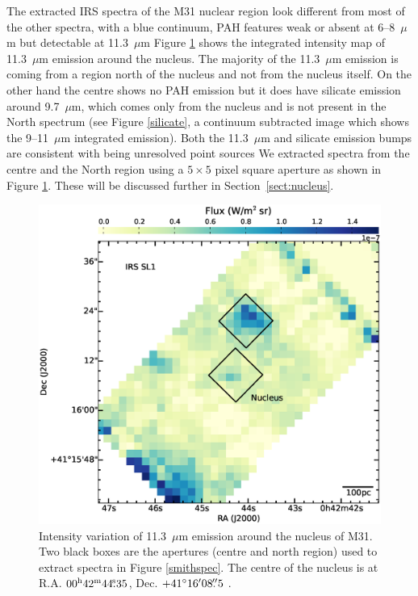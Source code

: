 The extracted IRS spectra of the M31 nuclear region look different from most of the other spectra, with
a blue continuum, PAH features weak or absent at 6--8~$\mu$m  but detectable at 11.3~$\mu$m
Figure \ref{nuc11} shows the integrated intensity map of 11.3~$\mu$m emission around the nucleus. The majority of the 11.3~$\mu$m 
emission is coming from a region north of the nucleus and not from the nucleus itself. 
On the other hand the centre shows no PAH emission  but it does have silicate emission around 9.7~$\mu$m, 
which comes only from the nucleus and is not present in the North spectrum 
(see Figure \ref{silicate}, a continuum subtracted image which shows the 9--11~$\mu$m integrated emission).
Both the 11.3~$\mu$m  and silicate emission bumps are consistent with being unresolved point sources %
We extracted spectra from the centre and the North region using a $5 \times 5$ pixel %
square aperture as shown in Figure \ref{nuc11}. These will be discussed further in Section~\ref{sect:nucleus}.


\begin{figure}
\centering
\includegraphics[width = 8 cm]{./nuc11_3.eps}
\caption{ Intensity variation of 11.3~$\mu$m emission around the nucleus of M31. 
Two black boxes are the apertures (centre and north region) used to extract spectra in Figure \ref{smithspec}. 
The centre of the nucleus is at R.A. $00^{\rm h}42^{\rm m}44\fs35$, Dec. $+41\hbox{$^\circ$}16\hbox{$^\prime$}08\hbox{$.\!\!^{\prime\prime}$}5$ \citep{NucleusREF}.}
\label{nuc11}
\end{figure}

